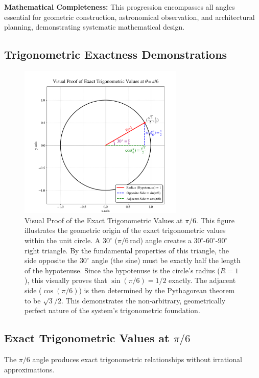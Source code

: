 \documentclass[11pt]{article}
\begin{document}
\textbf{Mathematical Completeness:} This progression encompasses all angles essential for geometric construction, astronomical observation, and architectural planning, demonstrating systematic mathematical design.

\subsection{Trigonometric Exactness Demonstrations}

\begin{figure}[h!]
\centering
\includegraphics[width=0.7\textwidth]{figures/trigonometric-fig.png}
\caption{Visual Proof of the Exact Trigonometric Values at $\pi/6$. This figure illustrates the geometric origin of the exact trigonometric values within the unit circle. A $30^\circ$ ($\pi/6$\,rad) angle creates a $30^\circ$-$60^\circ$-$90^\circ$ right triangle. By the fundamental properties of this triangle, the side opposite the $30^\circ$ angle (the sine) must be exactly half the length of the hypotenuse. Since the hypotenuse is the circle's radius ($R=1$), this visually proves that $\sin(\pi/6) = 1/2$ exactly. The adjacent side ($\cos(\pi/6)$) is then determined by the Pythagorean theorem to be $\sqrt{3}/2$. This demonstrates the non-arbitrary, geometrically perfect nature of the system's trigonometric foundation.}
\label{fig:trigonometric_proof}
\end{figure}

\subsection{Exact Trigonometric Values at \texorpdfstring{$\pi/6$}{pi/6}}
The $\pi/6$ angle produces exact trigonometric relationships without irrational approximations.
\end{document}

